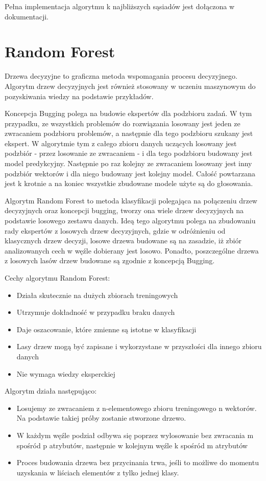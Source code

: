 \documentclass[brudnopis]{xmgr}
\begin{document}
Pełna implementacja algorytmu k najbliższych sąsiadów jest dołączona w dokumentacji.

\section{Random Forest}
Drzewa decyzyjne to graficzna metoda wspomagania procesu decyzyjnego. Algorytm drzew decyzyjnych jest również stosowany w uczeniu maszynowym do pozyskiwania wiedzy na podstawie przykładów.

Koncepcja Bugging polega na budowie ekspertów dla podzbioru zadań. W tym przypadku, ze wszystkich problemów do rozwiązania losowany jest jeden ze zwracaniem podzbioru problemów, a następnie dla tego podzbioru szukany jest ekspert. W algorytmie tym z całego zbioru danych uczących losowany jest podzbiór - przez losowanie ze zwracaniem - i dla tego podzbioru budowany jest model predykcyjny. Następnie po raz kolejny ze zwracaniem losowany jest inny podzbiór wektorów i dla niego budowany jest kolejny model. Całość powtarzana jest k krotnie a na koniec wszystkie zbudowane modele użyte są do głosowania.

Algorytm Random Forest to metoda klasyfikacji polegająca na połączeniu drzew decyzyjnych oraz koncepcji bugging, tworzy ona wiele drzew decyzyjnych na podstawie losowego zestawu danych. Ideą tego algorytmu polega na zbudowaniu rady ekspertów z losowych drzew decyzyjnych, gdzie w odróżnieniu od klasycznych drzew decyzji, losowe drzewa budowane są na zasadzie, iż zbiór analizowanych cech w węźle dobierany jest losowo. Ponadto, poszczególne drzewa z losowych lasów drzew budowane są zgodnie z koncepcją Bugging.

Cechy algorytmu Random Forest:
\begin{itemize}
\item
Działa skutecznie na dużych zbiorach treningowych
\item
Utrzymuje dokładność w przypadku braku danych
\item
Daje oszacowanie, które zmienne są istotne w klasyfikacji
\item
Lasy drzew mogą być zapisane i wykorzystane w przyszłości dla innego zbioru danych
\item
Nie wymaga wiedzy eksperckiej
\end{itemize}

Algorytm działa następująco:
\begin{itemize}
\item
Losujemy ze zwracaniem z n-elementowego zbioru treningowego n wektorów. Na podstawie takiej próby zostanie stworzone drzewo.
\item
W każdym węźle podział odbywa się poprzez wylosowanie bez zwracania m spośród p atrybutów, następnie w kolejnym węźle k spośród m atrybutów
\item
Proces budowania drzewa bez przycinania trwa, jeśli to możliwe do momentu uzyskania w liściach elementów z tylko jednej klasy.
\end{itemize}
\end{document}
